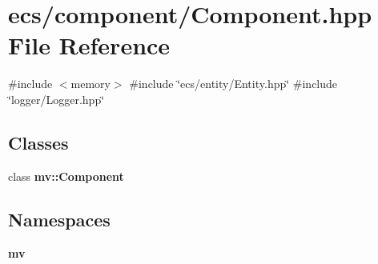 \section{ecs/component/\+Component.hpp File Reference}
\label{_component_8hpp}
{\ttfamily \#include $<$memory$>$}\newline
{\ttfamily \#include \char`\"{}ecs/entity/\+Entity.\+hpp\char`\"{}}\newline
{\ttfamily \#include \char`\"{}logger/\+Logger.\+hpp\char`\"{}}\newline
\subsection*{Classes}
\begin{DoxyCompactItemize}
\item 
class \textbf{ mv\+::\+Component}
\end{DoxyCompactItemize}
\subsection*{Namespaces}
\begin{DoxyCompactItemize}
\item 
 \textbf{ mv}
\end{DoxyCompactItemize}
